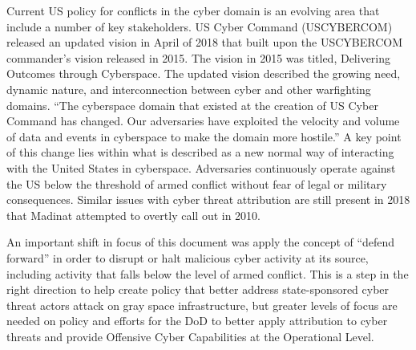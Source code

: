 \documentclass[12pt]{report}
\begin{document}
Current US policy for conflicts in the cyber domain is an evolving area that include a number of key stakeholders.  US Cyber Command (USCYBERCOM) released an updated vision in April of 2018 that built upon the USCYBERCOM commander’s vision released in 2015.  The vision in 2015 was titled, Delivering Outcomes through Cyberspace.  The updated vision described the growing need, dynamic nature, and interconnection between cyber and other warfighting domains.  “The cyberspace domain that existed at the creation of US Cyber Command has changed. Our adversaries have exploited the velocity and volume of data and events in cyberspace to make the domain more hostile.”  A key point of this change lies within what is described as a new normal way of interacting with the United States in cyberspace.  Adversaries continuously operate against the US below the threshold of armed conflict without fear of legal or military consequences.  Similar issues with cyber threat attribution are still present in 2018 that Madinat attempted to overtly call out in 2010.  \cite{uscybercom2018vision}

An important shift in focus of this document was apply the concept of “defend forward” in order to disrupt or halt malicious cyber activity at its source, including activity that falls below the level of armed conflict.  This is a step in the right direction to help create policy that better address state-sponsored cyber threat actors attack on gray space infrastructure, but greater levels of focus are needed on policy and efforts for the DoD to better apply attribution to cyber threats and provide Offensive Cyber Capabilities at the Operational Level.  \cite{goldsmith2022united}
\end{document}
